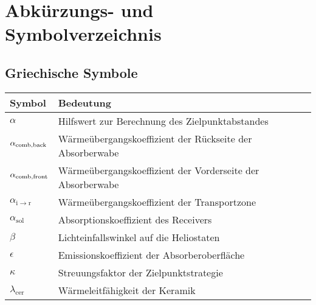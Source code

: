 \chapter*{Abkürzungs- und Symbolverzeichnis}
\renewcommand{\arraystretch}{1.5}
%

\vspace*{-1cm}
\section*{Griechische Symbole}
\begin{table}[ht!]
    \centering
    \begin{tabular}{m{}m{}}
        \rowcolor{white}
        Symbol                                  & Bedeutung                                                     \\
        \midrule
        $\alpha$                                & Hilfswert zur Berechnung des Zielpunktabstandes               \\
        $\alpha_{\mathrm{comb},\mathrm{back}}$  & Wärmeübergangskoeffizient der Rückseite der Absorberwabe      \\
        $\alpha_{\mathrm{comb},\mathrm{front}}$ & Wärmeübergangskoeffizient der Vorderseite der Absorberwabe    \\
        $\alpha_{\mathrm{i\to r}}$              & Wärmeübergangskoeffizient der Transportzone                   \\
        $\alpha_{\mathrm{sol}}$                 & Absorptionskoeffizient des Receivers                          \\
        $\beta$                                 & Lichteinfallswinkel auf die Heliostaten                       \\
        $\epsilon$                              & Emissionskoeffizient der Absorberoberfläche                   \\
        $\kappa$                                & Streuungsfaktor der Zielpunktstrategie                        \\
        $\lambda_{\mathrm{cer}}$                & Wärmeleitfähigkeit der Keramik                                \\

\end{tabular}
\end{table}
